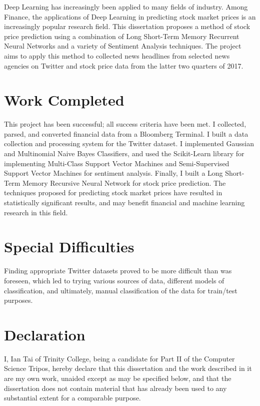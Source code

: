 \documentclass[12pt,a4paper,twoside,openright]{report}
\begin{document}
Deep Learning has increasingly been applied to many fields of industry. Among Finance,
the applications of Deep Learning in predicting stock market prices is an increasingly
popular research field. This dissertation proposes a method of stock price prediction
using a combination of Long Short-Term Memory Recurrent Neural Networks and a variety
of Sentiment Analysis techniques. The project aims to apply this method to collected 
news headlines from selected news agencies on Twitter and stock price data from the 
latter two quarters of 2017.

\section*{Work Completed}

This project has been successful; all success criteria have been met. I collected, parsed, and converted
financial data from a Bloomberg Terminal. I 
built a data collection and processing system for the Twitter dataset. I implemented
Gaussian and Multinomial Naive Bayes Classifiers, and used the
Scikit-Learn library for implementing Multi-Class Support Vector Machines and
Semi-Supervised Support Vector Machines for sentiment analysis. Finally, I built
a Long Short-Term Memory Recursive Neural Network for stock price prediction. The techniques
proposed for predicting stock market prices have resulted in statistically significant results,
and may benefit financial and machine learning research in this field.

\section*{Special Difficulties}

Finding appropriate Twitter datasets proved to be more difficult than was foreseen, which led to
trying various sources of data, different models of classification, and ultimately, manual classification
of the data for train/test purposes.
 
\newpage
\section*{Declaration}

I, Ian Tai of Trinity College, being a candidate for Part II of the Computer
Science Tripos, hereby declare
that this dissertation and the work described in it are my own work,
unaided except as may be specified below, and that the dissertation
does not contain material that has already been used to any substantial
extent for a comparable purpose.
\end{document}
